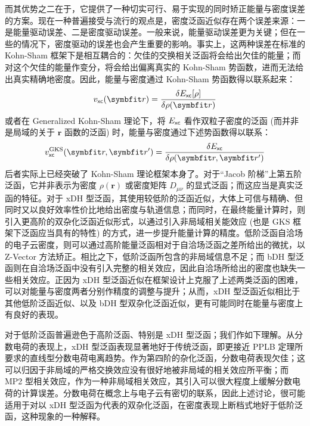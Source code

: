 而其优势之二在于，它提供了一种切实可行、易于实现的同时矫正能量与密度误差的方案。现在一种普遍接受与流行的观点是，密度泛函近似存在两个误差来源：一是能量驱动误差、二是密度驱动误差。一般来说，能量驱动误差更为关键\cite{Cohen-Yang.CR.2012}；但在一些的情况下，密度驱动的误差也会产生重要的影响\cite{Kim-Burke.JCP.2014}。事实上，这两种误差在标准的 Kohn-Sham 框架下是相互耦合的：欠佳的交换相关泛函将会给出欠佳的能量；而对这个欠佳的能量作变分，将会给出偏离真实的 Kohn-Sham 势函数，进而无法给出真实精确地密度。因此，能量与密度通过 Kohn-Sham 势函数得以联系起来：
\begin{equation}
    v_\textmt{xc} (\bm{r}) = \frac{\delta E_\textmt{xc} [\rho]}{\delta \rho(\bm{r})}
\end{equation}
或者在 Generalized Kohn-Sham 理论下，将 $E_{\textsf{xc}}$ 看作双粒子密度的泛函 (而并非是局域的关于 $\bm{r}$ 函数的泛函) 时，能量与密度通过下述势函数得以联系：
\begin{equation}
    v_\textmt{xc}^\mathrm{GKS} (\bm{r}, \bm{r}') = \frac{\delta E_\textmt{xc}}{\delta \rho(\bm{r}, \bm{r}')}
\end{equation}
后者实际上已经突破了 Kohn-Sham 理论框架本身了\cite{Su-Xu.WCMS.2016, Su-Xu.IJQC.2015, Su-Xu.MP.2016}。对于“Jacob 阶梯”上第五阶泛函，它并非表示为密度 $\rho(\bm{r})$ 或密度矩阵 $D_{\mu \nu}$ 的显式泛函；而这应当是真实泛函的特征\cite{Kohn-Kohn.PRB.1986, Yang-Mori-Sanchez.JCP.2012}。对于 xDH 型泛函，其使用较低阶的泛函近似，大体上可信与精确、但同时又以良好效率性价比地给出密度与轨道信息；而同时，在最终能量计算时，则引入更高阶的双杂化泛函近似形式，以通过引入非局域相关能效应 (也是 GKS 框架下泛函应当具有的特性) 的方式，进一步提升能量计算的精度。低阶泛函自洽场的电子云密度，则可以通过高阶能量泛函相对于自洽场泛函之差所给出的微扰，以 Z-Vector 方法矫正\cite{Handy-Schaefer.JCP.1984, Su-Xu.JCC.2013}。相比之下，低阶泛函所包含的非局域信息不足；而 bDH 型泛函则在自洽场泛函中没有引入完整的相关效应，因此自洽场所给出的密度也缺失一些相关效应。正因为 xDH 型泛函近似在框架设计上克服了上述两类泛函的困难，可以对能量与密度两者分别作精度的调整与提升；从而，xDH 型泛函近似相比于其他低阶泛函近似、以及 bDH 型双杂化泛函近似，更有可能同时在能量与密度上有良好的表现。

对于低阶泛函普遍逊色于高阶泛函、特别是 xDH 型泛函；我们作如下理解。从分数电荷的表现上，xDH 型泛函表现显著地好于传统泛函\cite{Su-Xu.IJQC.2015, Su-Xu.WCMS.2016, Su-Xu.MP.2016, Su-Xu.ARPC.2017}，即更接近 PPLB 定理所要求的直线型分数电荷电离趋势\cite{Perdew-Balduz.PRL.1982}。作为第四阶的杂化泛函，分数电荷表现欠佳；这可以归因于非局域的严格交换效应没有很好地被非局域的相关效应所平衡；而 MP2 型相关效应，作为一种非局域相关效应，其引入可以很大程度上缓解分数电荷的计算误差。分数电荷在概念上与电子云有密切的联系，因此上述讨论，很可能适用于对以 xDH 型泛函为代表的双杂化泛函，在密度表现上断档式地好于低阶泛函，这种现象的一种解释。

